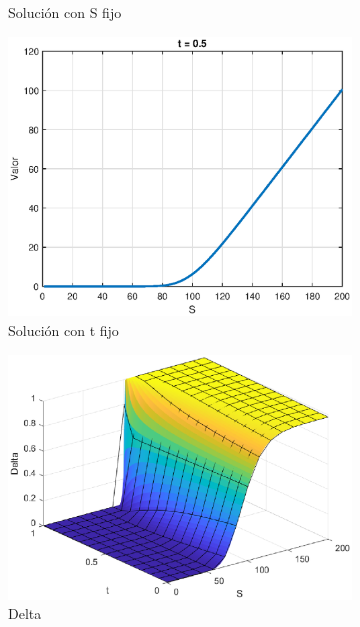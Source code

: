 \begin{figure}[H]
\begin{subfigure}[b]{0.35\linewidth}
        \caption{Solución con S fijo}
    \end{subfigure}
    \begin{subfigure}[b]{0.35\linewidth}
        \includegraphics[width=\linewidth]{Imagenes/6_Sols/Call/CalltFIjo.eps}
        \caption{Solución con t fijo}
    \end{subfigure}
    \begin{subfigure}[b]{0.35\linewidth}
        \includegraphics[width=\linewidth]{Imagenes/6_Sols/Call/Call_Delta.eps}
        \caption{Delta}
    \end{subfigure}
    \begin{subfigure}[b]{0.35\linewidth}

\end{subfigure}
\end{figure}
